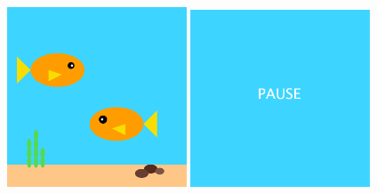\documentclass{ucph-handout}
\begin{document}
\begin{exercisebox}[adjusted title=Sæt på pause]
\begin{center}
  \includegraphics[width=0.40\textwidth]{../illustrations/images/fisk-begge-retninger.png}
  \quad
\includegraphics[width=0.4\textwidth]{../illustrations/images/fish-paused}
\end{center}
\end{exercisebox}







\end{document}
